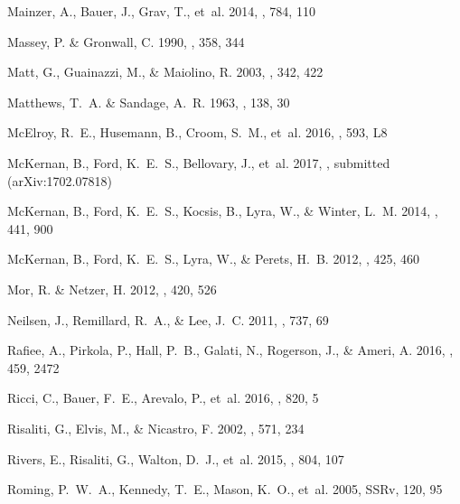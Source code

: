 \documentclass[iop]{emulateapj}
\begin{document}
\begin{thebibliography}{84}
Mainzer, A., Bauer, J., Grav, T., {et~al.} 2014, \apj, 784, 110

Massey, P. \& Gronwall, C. 1990, \apj, 358, 344

Matt, G., Guainazzi, M., \& Maiolino, R. 2003, \mnras, 342, 422

Matthews, T.~A. \& Sandage, A.~R. 1963, \apj, 138, 30

McElroy, R.~E., Husemann, B., Croom, S.~M., {et~al.} 2016, \aap, 593, L8

McKernan, B., Ford, K.~E.~S., Bellovary, J., {et~al.} 2017, \mnras, submitted
  (arXiv:1702.07818)

McKernan, B., Ford, K.~E.~S., Kocsis, B., Lyra, W., \& Winter, L.~M. 2014,
  \mnras, 441, 900

McKernan, B., Ford, K.~E.~S., Lyra, W., \& Perets, H.~B. 2012, \mnras, 425, 460

Mor, R. \& Netzer, H. 2012, \mnras, 420, 526

Neilsen, J., Remillard, R.~A., \& Lee, J.~C. 2011, \apj, 737, 69

Rafiee, A., Pirkola, P., Hall, P.~B., Galati, N., Rogerson, J., \& Ameri, A.
  2016, \mnras, 459, 2472

Ricci, C., Bauer, F.~E., Arevalo, P., {et~al.} 2016, \apj, 820, 5

Risaliti, G., Elvis, M., \& Nicastro, F. 2002, \apj, 571, 234

Rivers, E., Risaliti, G., Walton, D.~J., {et~al.} 2015, \apj, 804, 107

Roming, P.~W.~A., Kennedy, T.~E., Mason, K.~O., {et~al.} 2005, SSRv, 120, 95


\end{thebibliography}
\end{document}
